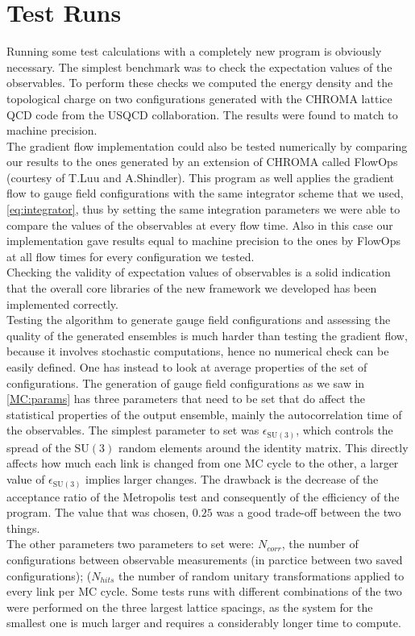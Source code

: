 \section{Test Runs}
\label{sec:testautocorr}
Running some test calculations with a completely new program is obviously necessary. The simplest benchmark was to check the expectation values of the observables. To perform these checks we computed the energy density and the topological charge on two configurations generated with the CHROMA lattice QCD code from the USQCD collaboration\cite{edwards_chroma_2005}.  The results were found to match to machine precision. \\
The gradient flow implementation could also be tested numerically by comparing our results to the ones generated by an extension of CHROMA called FlowOps (courtesy of T.Luu and A.Shindler)\cite{shindler_nucleon_2015}. This program as well applies the gradient flow to gauge field configurations with the same integrator scheme that we used, \cref{eq:integrator}, thus by setting the same integration parameters we were able to compare the values of the observables at every flow time. Also in this case our implementation gave results equal to machine precision to the ones by FlowOps at all flow times for every configuration we tested.\\
Checking the validity of expectation values of observables is a solid indication that the overall core libraries of the new framework we developed has been implemented correctly. \\
Testing the algorithm to generate gauge field configurations and assessing the quality of the generated ensembles is much harder than testing the gradient flow, because it involves stochastic computations, hence no numerical check can be easily defined. One has instead to look at average properties of the set of configurations. The generation of gauge field configurations as we saw in \cref{MC:params} has three parameters that need to be set that do affect the statistical properties of the output ensemble, mainly the autocorrelation time of the observables. The simplest parameter to set was $\epsilon_{\mathrm{SU}(3)}$, which controls the spread of the $\mathrm{SU}(3)$ random elements around the identity matrix. This directly affects how much each link is changed from one MC cycle to the other, a larger value of $\epsilon_{\mathrm{SU}(3)}$ implies larger changes. The drawback is the decrease of the acceptance ratio of the Metropolis test and consequently of the efficiency of the program. The value that was chosen, $0.25$ was a good trade-off between the two things.\\
The other parameters two parameters to set were: $N_{corr}$, the number of configurations between observable measurements (in parctice between two saved configurations); ($N_{hits}$ the number of random unitary transformations applied to every link per MC cycle. Some tests runs with different combinations of the two were performed on the three largest lattice spacings, as the system for the smallest one is much larger and requires a considerably longer time to compute.


